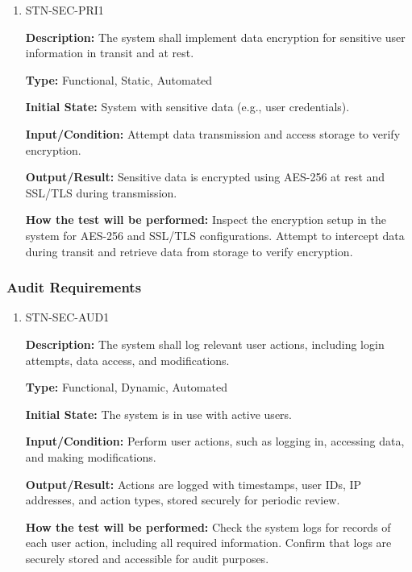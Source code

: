 \documentclass[12pt, titlepage]{article}
\begin{document}
\begin{enumerate}

\item{STN-SEC-PRI1\\}

\textbf{Description:} The system shall implement data encryption for sensitive user information in transit and at rest.

\textbf{Type:} Functional, Static, Automated

\textbf{Initial State:} System with sensitive data (e.g., user credentials).

\textbf{Input/Condition:} Attempt data transmission and access storage to verify encryption.

\textbf{Output/Result:} Sensitive data is encrypted using AES-256 at rest and SSL/TLS during transmission.

\textbf{How the test will be performed:} Inspect the encryption setup in the system for AES-256 and SSL/TLS configurations. Attempt to intercept data during transit and retrieve data from storage to verify encryption.

\end{enumerate}

\subsubsection{Audit Requirements}

\begin{enumerate}

\item{STN-SEC-AUD1\\}

\textbf{Description:} The system shall log relevant user actions, including login attempts, data access, and modifications.

\textbf{Type:} Functional, Dynamic, Automated

\textbf{Initial State:} The system is in use with active users.

\textbf{Input/Condition:} Perform user actions, such as logging in, accessing data, and making modifications.

\textbf{Output/Result:} Actions are logged with timestamps, user IDs, IP addresses, and action types, stored securely for periodic review.

\textbf{How the test will be performed:} Check the system logs for records of each user action, including all required information. Confirm that logs are securely stored and accessible for audit purposes.

\end{enumerate}
\end{document}
